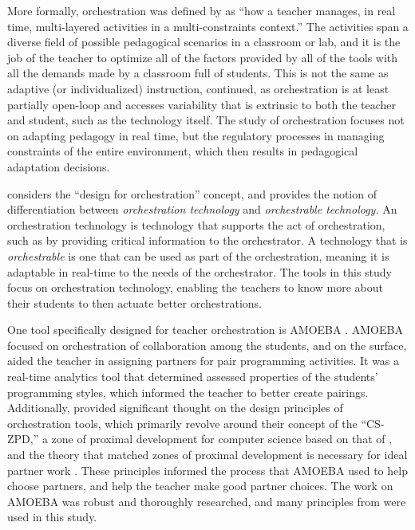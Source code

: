 More formally, orchestration was defined by \citet{dillenbourg2012design} as ``how a teacher manages, in real time, multi-layered activities in a multi-constraints context.'' The activities span a diverse field of possible pedagogical scenarios in a classroom or lab, and it is the job of the teacher to optimize all of the factors provided by all of the tools with all the demands made by a classroom full of students. This is not the same as adaptive (or individualized) instruction, \citet{dillenbourg2012design} continued, as orchestration is at least partially open-loop and accesses variability that is extrinsic to both the teacher and student, such as the technology itself. The study of orchestration focuses not on adapting pedagogy in real time, but the regulatory processes in managing constraints of the entire environment, which then results in pedagogical adaptation decisions.

\citet{tchounikine2013clarifying} considers the ``design for orchestration'' concept, and provides the notion of differentiation between \emph{orchestration technology} and \emph{orchestrable technology.} An orchestration technology is technology that supports the act of orchestration, such as by providing critical information to the orchestrator. A technology that is \emph{orchestrable} is one that can be used as part of the orchestration, meaning it is adaptable in real-time to the needs of the orchestrator. The tools in this study focus on orchestration technology, enabling the teachers to know more about their students to then actuate better orchestrations. 

One tool specifically designed for teacher orchestration is AMOEBA \citep{berland2015amoeba}. AMOEBA focused on orchestration of collaboration among the students, and on the surface, aided the teacher in assigning partners for pair programming activities. It was a real-time analytics tool that determined assessed properties of the students' programming styles, which informed the teacher to better create pairings. Additionally, \citeauthor{berland2015amoeba} provided significant thought on the design principles of orchestration tools, which primarily revolve around their concept of the ``CS-ZPD,'' a zone of proximal development for computer science based on that of \citet{vygotsky1987collected}, and the theory that matched zones of proximal development is necessary for ideal partner work \citep{cooper2007effectiveness}. These principles informed the process that AMOEBA used to help choose partners, and help the teacher make good partner choices. The work on AMOEBA \citep{berland2015amoeba}was robust and thoroughly researched, and many principles from were used in this study. 


